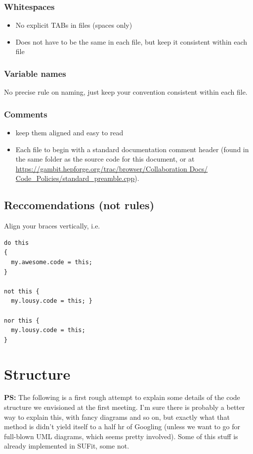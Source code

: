 \subsubsection{Whitespaces} 
\begin{itemize} 
  \item No explicit TABs in files (spaces only)
  \item Does not have to be the same in each file, but keep it consistent within each file
\end{itemize}

\subsubsection{Variable names} No precise rule on naming, just keep your convention consistent within each file.

\subsubsection{Comments}
\label{comments} 
\begin{itemize} 
  \item keep them aligned and easy to read
  \item Each file to begin with a standard documentation comment header (found in the same folder as the source code for this document, or at \href{https://gambit.hepforge.org/trac/browser/Collaboration\%20Docs/Code\_Policies/standard_preamble.cpp}{https://gambit.hepforge.org/trac/browser/Collaboration Docs/\\Code\_Policies/standard\_preamble.cpp}).
\end{itemize} 


\subsection{Reccomendations (not rules)}

Align your braces vertically, i.e. 
\begin{verbatim}
do this
{ 
  my.awesome.code = this;
}

not this {
  my.lousy.code = this; }

nor this {
  my.lousy.code = this; 
}
\end{verbatim}

\section{Structure}

\textbf{PS:} The following is a first rough attempt to explain some details of the code structure we envisioned at the first meeting.  I'm sure there is probably a better way to explain this, with fancy diagrams and so on, but exactly what that method is didn't yield itself to a half hr of Googling (unless we want to go for full-blown UML diagrams, which seems pretty involved).  Some of this stuff is already implemented in SUFit, some not.

